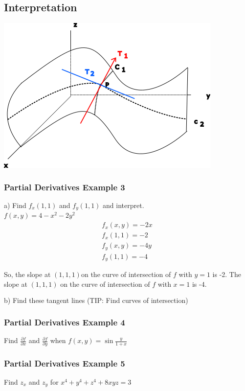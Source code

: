 \documentclass[12pt]{article}
\begin{document}
\subsection{Interpretation}
\includegraphics{partialderivativeslopes}

\subsubsection{Partial Derivatives Example 3}
a) Find \(f_x(1,1)\)  and \(f_y(1,1)\) and interpret.\\
\(f(x,y) = 4-x^2-2y^2\) 
\begin{align}
	f_x(x,y) = -2x\\
	f_x(1,1) = -2\\
	f_y(x,y) = -4y\\
	f_y(1,1) = -4
\end{align}

So, the slope at \((1,1,1)\)on the curve of intersection of \(f\) with \(y=1\) is -2.
The slope at \((1,1,1)\) on the curve of intersection of \(f\) with \(x=1\) is -4.

b) Find these tangent lines (TIP: Find curves of intersection)

\subsubsection{Partial Derivatives Example 4}
Find \(\frac{\partial f}{\partial x} \) and \(\frac{\partial f}{\partial y} \) when \(f(x,y) = \sin \frac{y}{1+x}\) 

\subsubsection{Partial Derivatives Example 5}
Find \(z_x\) and \(z_y\) for \(x^4 + y^4 + z^4 + 8xyz = 3\) 
\end{document}
